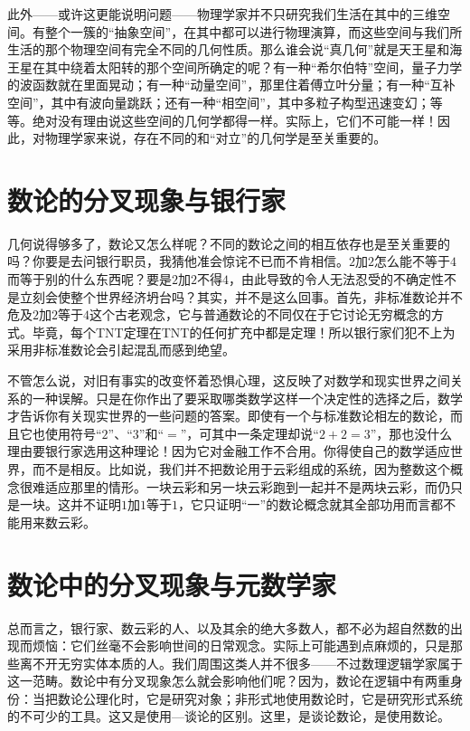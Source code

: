 此外——或许这更能说明问题——物理学家并不只研究我们生活在其中的三维空间。有整个一簇的“抽象空间”，在其中都可以进行物理演算，而这些空间与我们所生活的那个物理空间有完全不同的几何性质。那么谁会说“真几何”就是天王星和海王星在其中绕着太阳转的那个空间所确定的呢？有一种“希尔伯特”空间，量子力学的波函数就在里面晃动；有一种“动量空间”，那里住着傅立叶分量；有一种“互补空间”，其中有波向量跳跃；还有一种“相空间”，其中多粒子构型迅速变幻；等等。绝对没有理由说这些空间的几何学都得一样。实际上，它们不可能一样！因此，对物理学家来说，存在不同的和“对立”的几何学是至关重要的。

\section{数论的分叉现象与银行家}

几何说得够多了，数论又怎么样呢？不同的数论之间的相互依存也是至关重要的吗？你要是去问银行职员，我猜他准会惊诧不已而不肯相信。$2$加$2$怎么能不等于$4$而等于别的什么东西呢？要是$2$加$2$不得$4$，由此导致的令人无法忍受的不确定性不是立刻会使整个世界经济坍台吗？其实，并不是这么回事。首先，非标准数论并不危及$2$加$2$等于$4$这个古老观念，它与普通数论的不同仅在于它讨论无穷概念的方式。毕竟，每个TNT定理在TNT的任何扩充中都是定理！所以银行家们犯不上为采用非标准数论会引起混乱而感到绝望。

不管怎么说，对旧有事实的改变怀着恐惧心理，这反映了对数学和现实世界之间关系的一种误解。只是在你作出了要采取哪类数学这样一个决定性的选择之后，数学才告诉你有关现实世界的一些问题的答案。即使有一个与标准数论相左的数论，而且它也使用符号“$2$”、“$3$”和“$=$”，可其中一条定理却说“$2+2=3$”，那也没什么理由要银行家选用这种理论！因为它对金融工作不合用。你得使自己的数学适应世界，而不是相反。比如说，我们并不把数论用于云彩组成的系统，因为整数这个概念很难适应那里的情形。一块云彩和另一块云彩跑到一起并不是两块云彩，而仍只是一块。这并不证明$1$加$1$等于$1$，它只证明“一”的数论概念就其全部功用而言都不能用来数云彩。

\section{数论中的分叉现象与元数学家}

总而言之，银行家、数云彩的人、以及其余的绝大多数人，都不必为超自然数的出现而烦恼：它们丝毫不会影响世间的日常观念。实际上可能遇到点麻烦的，只是那些离不开无穷实体本质的人。我们周围这类人并不很多——不过数理逻辑学家属于这一范畴。数论中有分叉现象怎么就会影响他们呢？因为，数论在逻辑中有两重身份：当把数论公理化时，它是研究对象；非形式地使用数论时，它是研究形式系统的不可少的工具。这又是使用—谈论的区别。这里，是谈论数论，是使用数论。

